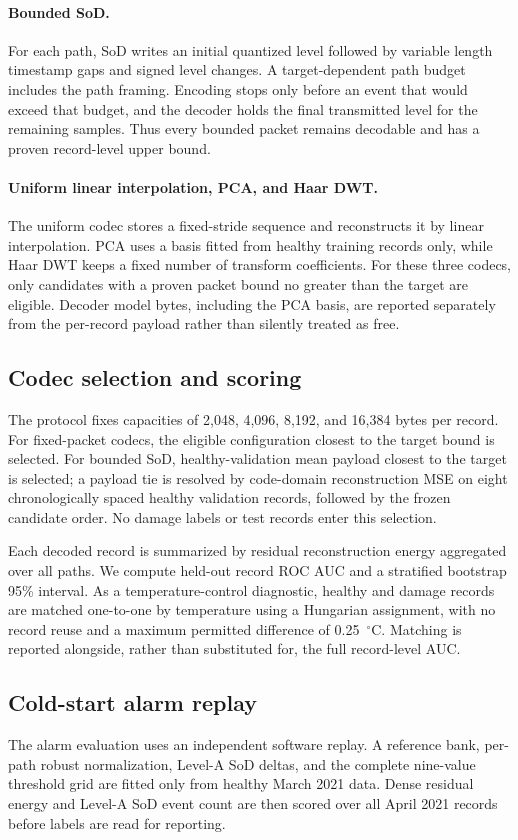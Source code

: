 \paragraph{Bounded SoD.}
For each path, SoD writes an initial quantized level followed by variable
length timestamp gaps and signed level changes. A target-dependent path
budget includes the path framing. Encoding stops only before an event that
would exceed that budget, and the decoder holds the final transmitted level
for the remaining samples. Thus every bounded packet remains decodable and
has a proven record-level upper bound.

\paragraph{Uniform linear interpolation, PCA, and Haar DWT.}
The uniform codec stores a fixed-stride sequence and reconstructs it by
linear interpolation. PCA uses a basis fitted from healthy training records
only, while Haar DWT keeps a fixed number of transform coefficients. For
these three codecs, only candidates with a proven packet bound no greater
than the target are eligible. Decoder model bytes, including the PCA basis,
are reported separately from the per-record payload rather than silently
treated as free.

\subsection{Codec selection and scoring}
The protocol fixes capacities of 2,048, 4,096, 8,192, and 16,384 bytes per
record. For fixed-packet codecs, the eligible configuration closest to the
target bound is selected. For bounded SoD, healthy-validation mean payload
closest to the target is selected; a payload tie is resolved by
code-domain reconstruction MSE on eight chronologically spaced healthy
validation records, followed by the frozen candidate order. No damage labels
or test records enter this selection.

Each decoded record is summarized by residual reconstruction energy aggregated
over all paths. We compute held-out record ROC AUC and a stratified bootstrap
95\% interval. As a temperature-control diagnostic, healthy and damage
records are matched one-to-one by temperature using a Hungarian assignment,
with no record reuse and a maximum permitted difference of
0.25~$^\circ$C. Matching is reported alongside, rather than substituted for,
the full record-level AUC.

\subsection{Cold-start alarm replay}
The alarm evaluation uses an independent software replay. A reference bank,
per-path robust normalization, Level-A SoD deltas, and the complete
nine-value threshold grid are fitted only from healthy March 2021 data.
Dense residual energy and Level-A SoD event count are then scored over all
April 2021 records before labels are read for reporting.

